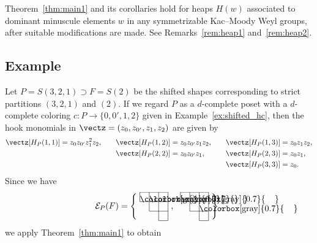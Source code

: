\begin{rema}
\label{rem:heap3}
Theorem~\ref{thm:main1} and its corollaries hold for heaps $H(w)$ associated 
to dominant minuscule elements $w$ in any symmetrizable Kac--Moody Weyl groups, 
after suitable modifications are made.
See Remarks~\ref{rem:heap1} and~\ref{rem:heap2}.
\end{rema}

\subsection{%
Example
}

\begin{exam}
\label{ex:dc}
Let $P = S(3,2,1) \supset F = S(2)$ be the shifted shapes corresponding 
to strict partitions $(3,2,1)$ and $(2)$.
If we regard $P$ as a $d$-complete poset with a $d$-complete coloring $c : P \to \{ 0, 0', 1, 2 \}$ 
given in Example~\ref{ex:shifted_hc}, 
then the hook monomials in 
${{\vectz}} = (z_0, z_{0'}, z_1, z_2)$ are given by
\begin{alignat*}{3}
{{\vectz}}[ H_P(1,1) ] &= z_0 z_{0'} z_1^2 z_2,
&\quad
{{\vectz}}[ H_P(1,2) ] &= z_0 z_{0'} z_1 z_2,
&\quad
{{\vectz}}[ H_P(1,3) ] &= z_0 z_1 z_2,
\\
&
&
{{\vectz}}[ H_P(2,2) ] &= z_0 z_{0'} z_1,
&\quad
{{\vectz}}[ H_P(2,3) ] &= z_0 z_1,
\\
&
&
&
&{{\vectz}}[ H_P(3,3) ] &= z_0.
\end{alignat*}
Since we have
$$
\setlength{\unitlength}{1.1pt}
\mathcal{E}_P(F)
 =
\left\{
\raisebox{-14pt}{
\begin{picture}(30,30)
\fboxsep=0mm
\put(0,20){\colorbox[gray]{0.7}{\makebox(10,10){}}}
\put(10,20){\colorbox[gray]{0.7}{\makebox(10,10){}}}
\put(0,30){\line(1,0){30}}
\put(0,20){\line(1,0){30}}
\put(10,10){\line(1,0){20}}
\put(20,0){\line(1,0){10}}
\put(0,20){\line(0,1){10}}
\put(10,10){\line(0,1){20}}
\put(20,0){\line(0,1){30}}
\put(30,0){\line(0,1){30}}
\end{picture}
},
\ 
\raisebox{-14pt}{
\begin{picture}(30,30)
\fboxsep=0mm
\put(0,20){\colorbox[gray]{0.7}{\makebox(10,10){}}}
\put(20,10){\colorbox[gray]{0.7}{\makebox(10,10){}}}
\put(0,30){\line(1,0){30}}
\put(0,20){\line(1,0){30}}
\put(10,10){\line(1,0){20}}
\put(20,0){\line(1,0){10}}
\put(0,20){\line(0,1){10}}
\put(10,10){\line(0,1){20}}
\put(20,0){\line(0,1){30}}
\put(30,0){\line(0,1){30}}
\put(10,20){\makebox(10,10){$\times$}}
\end{picture}
}
\right\},
$$
we apply Theorem~\ref{thm:main1} to obtain

\end{exam}
